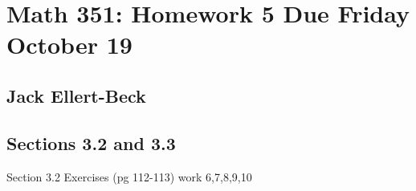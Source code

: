 \documentclass[11pt]{article}
\begin{document}
\setlength{\parindent}{0pt}
\setlength{\parskip}{9pt}


\section*{Math 351: Homework 5  Due Friday October 19 }
\subsection*{Jack Ellert-Beck}

\bigskip

\subsection*{Sections 3.2 and 3.3}

Section 3.2 Exercises (pg 112-113) work 6,7,8,9,10
\end{document}
